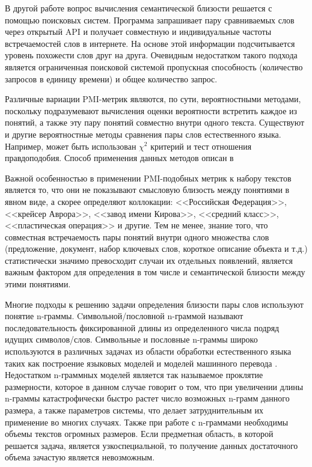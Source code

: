 В другой работе \cite{search_eng} вопрос вычисления семантической близости решается с помощью поисковых систем. Программа запрашивает пару сравниваемых слов через открытый API и получает совместную и индивидуальные частоты встречаемостей слов в интернете. На основе этой информации подсчитывается уровень похожести слов друг на друга. Очевидным недостатком такого подхода является ограниченная поисковой системой пропускная способность (количество запросов в единицу времени) и общее количество запрос.

Различные вариации PMI-метрик являются, по сути, вероятностными методами, поскольку подразумевают вычисления оценки вероятности встретить каждое из понятий, а также эту пару понятий совместно внутри одного текста. Существуют и другие вероятностные методы сравнения пары слов естественного языка. Например, может быть использован $\chi^2$ критерий и тест отношения правдоподобия. Способ применения данных методов описан в \cite{freq_est_overview}

Важной особенностью в применении PMI-подобных метрик к набору текстов является то, что они не показывают смысловую близость между понятиями в явном виде, а скорее определяют коллокации: <<Российская Федерация>>, <<крейсер Аврора>>, <<завод имени Кирова>>, <<средний класс>>, <<пластическая операция>> и другие. Тем не менее, знание того, что совместная встречаемость пары понятий внутри одного множества слов (предложение, документ, набор ключевых слов, короткое описание объекта и т.д.) статистически значимо превосходит случаи их отдельных появлений, является важным фактором для определения в том числе и семантической близости между этими понятиями.

Многие подходы к решению задачи определения близости пары слов используют понятие n-граммы.
Cимвольной/пословной n-граммой называют последовательность фиксированной длины из определенного числа подряд идущих символов/слов. Символьные и пословные n-граммы широко используются в различных задачах из области обработки естественного языка таких как построение языковых моделей \cite{ngrams_1,ngrams_2,ngrams_3,ngrams_4} и моделей машинного перевода \cite{ngrams_mt_1,ngrams_mt_2,ngrams_mt_3}. Недостатком n-граммных моделей является так называемое проклятие размерности, которое в данном случае говорит о том, что при увеличении длины n-граммы катастрофически быстро растет число возможных n-грамм данного размера, а также параметров системы, что делает затруднительным их применение во многих случаях. Также при работе с n-граммами необходимы объемы текстов огромных размеров. Если предметная область, в которой решается задача, является узкоспециальной, то получение данных достаточного объема зачастую является невозможным.

